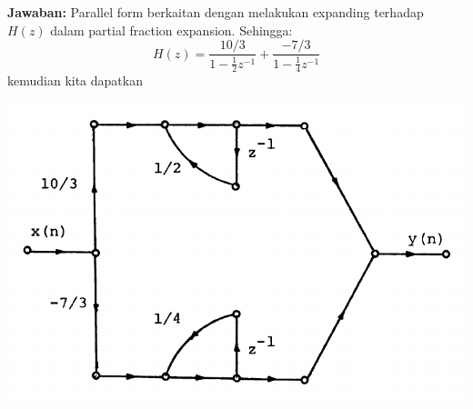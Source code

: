 \documentclass[12pt,a4paper]{article}
\begin{document}
\begin{enumerate}
\begin{enumerate}
			\textbf{Jawaban:} Parallel form berkaitan dengan melakukan expanding terhadap $ H(z) $ dalam partial fraction expansion. Sehingga:
			\[ H(z) = \frac{10/3}{1 - \frac{1}{2}z^{-1}} + \frac{-7/3}{1 - \frac{1}{4}z^{-1}} \]
			kemudian kita dapatkan
			\begin{center}
				\includegraphics[width=0.5\linewidth]{img/img06}
			\end{center}
		\end{enumerate}
	\end{enumerate}
\end{document}

